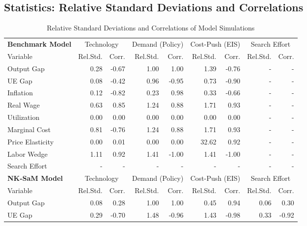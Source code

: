 \documentclass[12pt,3p,authoryear,review]{elsarticle}
\begin{document}
\subsection{Statistics: Relative Standard Deviations and Correlations}\label{sec:second_moments}%
\begin{table}[t]%
	\begin{center}%
		\begin{footnotesize}%
			\caption{Relative Standard Deviations and Correlations of Model Simulations}\label{tab:simul_stats}%
			\begin{tabular}{l r r r r r r r r}%
				\hline%
				\textbf{Benchmark Model}& \multicolumn{2}{c}{Technology} & \multicolumn{2}{c}{Demand (Policy)} & \multicolumn{2}{c}{Cost-Push (EIS)} & \multicolumn{2}{c}{Search Effort}\\%
				Variable & Rel.Std. & Corr. & Rel.Std. & Corr. & Rel.Std. & Corr. & Rel.Std. & Corr.\\%
				\hline \hline%
				Output Gap & 0.28 & -0.67 & 1.00 & 1.00 & 1.39 & -0.76 & - & -\\%
				UE Gap & 0.08 & -0.42 & 0.96 & -0.95 & 0.73 & -0.90 & - & -\\%
				Inflation & 0.12 & -0.82 & 0.23 & 0.98 & 0.33 & -0.66 & - & -\\%
				Real Wage & 0.63 & 0.85 & 1.24 & 0.88 & 1.71 & 0.93 & - & -\\%
				Utilization & 0.00 & 0.00 & 0.00 & 0.00 & 0.00 & 0.00 & - & -\\%
				Marginal Cost & 0.81 & -0.76 & 1.24 & 0.88 & 1.71 & 0.93 & - & -\\%
				Price Elasticity & 0.00 & 0.01 & 0.00 & 0.00 & 32.62 & 0.92 & - & -\\%
				Labor Wedge & 1.11 & 0.92 & 1.41 & -1.00 & 1.41 & -1.00 & - & -\\%
				Search Effort & - & - & - & - & - & - & - & -\\%
				\hline \hline%
				\textbf{NK-SaM Model}& \multicolumn{2}{c}{Technology} & \multicolumn{2}{c}{Demand (Policy)} & \multicolumn{2}{c}{Cost-Push (EIS)} & \multicolumn{2}{c}{Search Effort}\\%
				Variable & Rel.Std. & Corr. & Rel.Std. & Corr. & Rel.Std. & Corr. & Rel.Std. & Corr.\\%
				\hline \hline%
				Output Gap & 0.08 & 0.28 & 1.00 & 1.00 & 0.45 & 0.94 & 0.06 & 0.30\\%
				UE Gap & 0.29 & -0.70 & 1.48 & -0.96 & 1.43 &-0.98 & 0.33 & -0.92\\%

\end{tabular}
\end{footnotesize}
\end{center}
\end{table}
\end{document}
